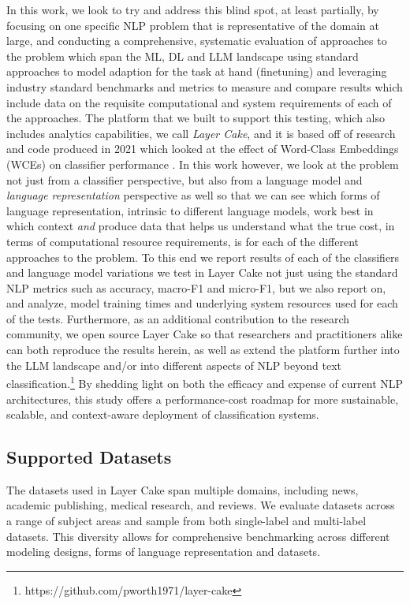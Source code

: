 \documentclass[final]{clv2025-revised}
\begin{document}
In this work, we look to try and address this blind spot, at least partially, by focusing on one specific NLP problem that is representative of the domain at large, and conducting a comprehensive, systematic evaluation of approaches to the problem which span the ML, DL and LLM landscape using standard approaches to model adaption for the task at hand (finetuning) and leveraging industry standard benchmarks and metrics to measure and compare results which include data on the requisite computational and system requirements of each of the approaches. The platform that we built to support this testing, which also includes analytics capabilities, we call \textit{Layer Cake}, and it is based off of research and code produced in 2021 which looked at the effect of Word-Class Embeddings (WCEs) on classifier performance \cite{moreo2021}. In this work however, we look at the problem not just from a classifier perspective, but also from a language model and \textit{language representation} perspective as well so that we can see which forms of language representation, intrinsic to different language models, work best in which context \textit{and} produce data that helps us understand what the true cost, in terms of computational resource requirements, is for each of the different approaches to the problem. To this end we report results of each of the classifiers and language model variations we test in Layer Cake not just using the standard NLP metrics such as accuracy, macro-F1 and micro-F1, but we also report on, and analyze, model training times and underlying system resources used for each of the tests. Furthermore, as an additional contribution to the research community, we open source Layer Cake so that researchers and practitioners alike can both reproduce the results herein, as well as extend the platform further into the LLM landscape and/or into different aspects of NLP beyond text classification.\footnote{https://github.com/pworth1971/layer-cake} By shedding light on both the efficacy and expense of current NLP architectures, this study offers a performance-cost roadmap for more sustainable, scalable, and context-aware deployment of classification systems. 


\subsection{Supported Datasets}

The datasets used in Layer Cake span multiple domains, including news, academic publishing, medical research, and reviews. We evaluate datasets across a range of subject areas and sample from both single-label and multi-label datasets. This diversity allows for comprehensive benchmarking across different modeling designs, forms of language representation and datasets.
\end{document}
